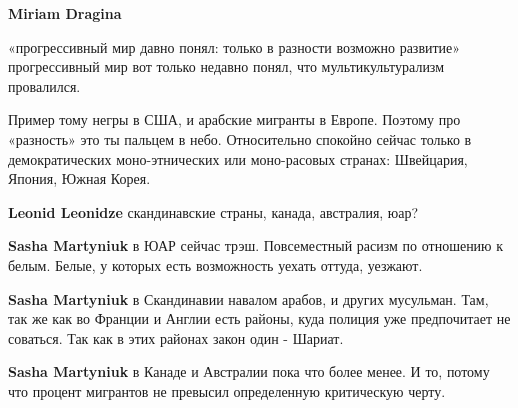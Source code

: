 \begin{itemize}
\textbf{Miriam Dragina}

«прогрессивный мир давно понял: только в разности возможно развитие»
прогрессивный мир вот только недавно понял, что мультикультурализм провалился.

Пример тому негры в США, и арабские мигранты в Европе. Поэтому про «разность»
это ты пальцем в небо. Относительно спокойно сейчас только в демократических
моно-этнических или моно-расовых странах: Швейцария, Япония, Южная Корея.

\begin{itemize}
 
\textbf{Leonid Leonidze} скандинавские страны, канада, австралия, юар?

 
\textbf{Sasha Martyniuk} в ЮАР сейчас трэш. Повсеместный расизм по отношению к белым. Белые, у которых есть возможность уехать оттуда, уезжают.

 
\textbf{Sasha Martyniuk} в Скандинавии навалом арабов, и других мусульман. Там, так же как во Франции и Англии есть районы, куда полиция уже предпочитает не соваться. Так как в этих районах закон один - Шариат.

 
\textbf{Sasha Martyniuk} в Канаде и Австралии пока что более менее. И то, потому что процент мигрантов не превысил определенную критическую черту.

 

\end{itemize}
\end{itemize}
